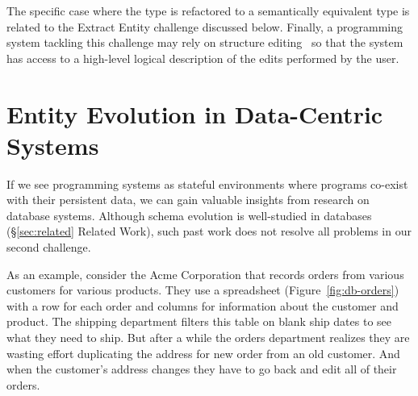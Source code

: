 \documentclass[english,submission]{programming}
\begin{document}
The specific case where the type is refactored to a semantically equivalent type is related to
the Extract Entity challenge discussed below. Finally, a programming system tackling this
challenge may rely on structure editing~\cite{Teitelbaum81} so that the system has access to a high-level logical
description of the edits performed by the user.


\section{Entity Evolution in Data-Centric Systems}
If we see programming systems as stateful environments where programs co-exist with their persistent
data, we can gain valuable insights from research on database systems.
Although schema evolution is well-studied in databases (\S\ref{sec:related} Related Work), such past work
does not resolve all problems in our second challenge.

As an example, consider the Acme Corporation that records orders from various customers for
various products. They use a spreadsheet (Figure~\ref{fig:db-orders}) with a row for each order
and columns for information about the customer and product. The shipping department filters this
table on blank ship dates to see what they need to ship. But after a while the orders department
realizes they are wasting effort duplicating the address for new order from an old customer. And
when the customer's address changes they have to go back and edit all of their orders.
\end{document}

